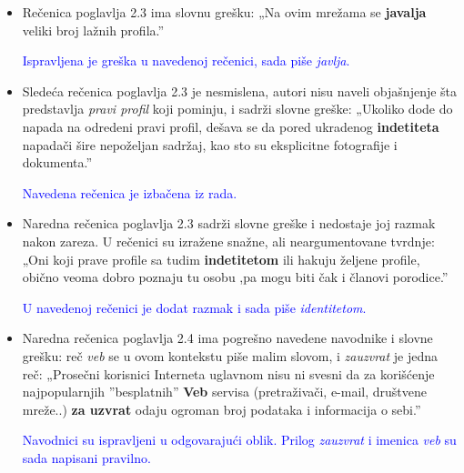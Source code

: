 \documentclass[a4paper]{report}
\newcommand{\odgovor}[1]{\textcolor{blue}{#1}}
\begin{document}
\begin{itemize}
    \item Rečenica poglavlja 2.3 ima slovnu grešku: \newline
    „Na ovim mrežama se \textbf{javalja} veliki broj lažnih profila.”
    
    \odgovor{Ispravljena je greška u navedenoj rečenici, sada piše \textit{javlja}.}
    
\end{itemize}
\begin{itemize}
    \item Sledeća rečenica poglavlja 2.3 je nesmislena, autori nisu naveli objašnjenje šta predstavlja \textit{pravi profil} koji pominju, i sadrži slovne greške:\newline
    „Ukoliko dode do napada na odredeni pravi profil, dešava se da pored ukradenog \textbf{indetiteta} napadači šire nepoželjan sadržaj, kao sto su eksplicitne fotografije i dokumenta.”
    
    \odgovor{Navedena rečenica je izbačena iz rada.}
    
\end{itemize}
\begin{itemize}
    \item Naredna rečenica poglavlja 2.3 sadrži slovne greške i nedostaje joj razmak nakon zareza. U rečenici su izražene snažne, ali neargumentovane tvrdnje: \newline
    „Oni koji prave profile sa tudim \textbf{indetitetom} ili hakuju željene profile, obično veoma dobro poznaju tu osobu ,pa mogu biti čak i članovi porodice.”
    
    \odgovor{U navedenoj rečenici je dodat razmak i sada piše \textit{identitetom}.}
    
\end{itemize}
\begin{itemize}
    \item Naredna rečenica poglavlja 2.4 ima pogrešno navedene navodnike i slovne grešku: reč  \textit{veb} se u ovom kontekstu piše malim slovom, i \textit{zauzvrat} je jedna reč: \newline
    „Prosečni korisnici Interneta uglavnom nisu ni svesni da za korišćenje najpopularnjih ”besplatnih” \textbf{Veb} servisa (pretraživači, e-mail, društvene mreže..) \textbf{za uzvrat} odaju ogroman broj podataka i informacija o sebi.”
    
    \odgovor{Navodnici su ispravljeni u odgovarajući oblik. Prilog \textit{zauzvrat} i imenica \textit{veb} su sada napisani pravilno.}
        
\end{itemize}
\end{document}
